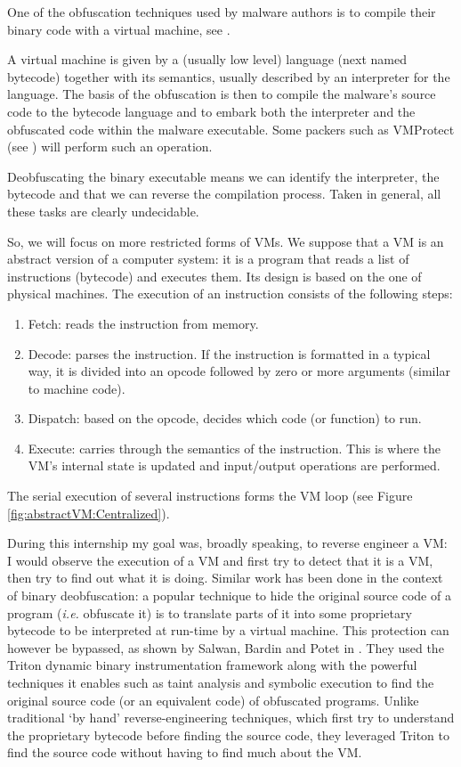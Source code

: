 \documentclass[english]{article}
\begin{document}
One of the obfuscation techniques used by malware authors is to compile their binary code with a virtual machine, see \cite{surreptsoft}.

A virtual machine is given by a (usually low level) language (next named bytecode) together with its semantics, usually described by an interpreter for the language. The basis of the obfuscation is then to compile the malware's source code to the bytecode language and to embark both the interpreter and the obfuscated code within the malware executable. Some packers such as VMProtect (see \cite{vmprotect}) will perform such an operation.

Deobfuscating the binary executable means we can identify the interpreter,
the bytecode and that we can reverse the compilation process. Taken in
general, all these tasks are clearly undecidable.

So, we will focus on more restricted forms of VMs. We suppose that a VM is an abstract version of a computer system: it is a program that reads a list of instructions (bytecode) and executes them. Its design is based on the one of physical machines. The execution of an instruction consists of the following steps:
\begin{enumerate}
	\item Fetch: reads the instruction from memory.
	\item Decode: parses the instruction. If the instruction is formatted in a typical way, it is divided into an opcode followed by zero or more arguments (similar to machine code).
	\item Dispatch: based on the opcode, decides which code (or function) to run.
	\item Execute: carries through the semantics of the instruction. This is where the VM's internal state is updated and input/output operations are performed.
\end{enumerate}
The serial execution of several instructions forms the VM loop (see Figure \ref{fig:abstractVM:Centralized}).

During this internship my goal was, broadly speaking, to reverse engineer a VM: I would observe the execution of a VM and first try to detect that it is a VM, then try to find out what it is doing. Similar work has been done in the context of binary deobfuscation: a popular technique to hide the original source code of a program (\textit{i.e.} obfuscate it) is to translate parts of it into some proprietary bytecode to be interpreted at run-time by a virtual machine. This protection can however be bypassed, as shown by Salwan, Bardin and Potet in \cite{tritondeobfs}. They used the Triton dynamic binary instrumentation framework along with the powerful techniques it enables such as taint analysis and symbolic execution to find the original source code (or an equivalent code) of obfuscated programs. Unlike traditional `by hand' reverse-engineering techniques, which first try to understand the proprietary bytecode before finding the source code, they leveraged Triton to find the source code without having to find much about the VM. 
\end{document}

